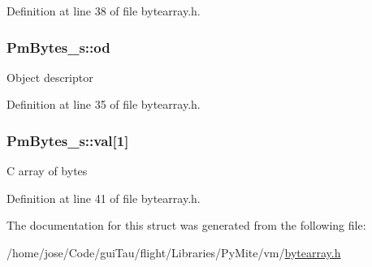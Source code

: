 Definition at line 38 of file bytearray.\-h.

\hypertarget{struct_pm_bytes__s_af46dba8cd181c493c83f48d7744f29d1}{
\subsubsection[{od}]{ Pm\-Bytes\-\_\-s\-::od}}\label{struct_pm_bytes__s_af46dba8cd181c493c83f48d7744f29d1}
Object descriptor 

Definition at line 35 of file bytearray.\-h.

\hypertarget{struct_pm_bytes__s_a48c85dd0c8010f5e5ee924dbc893031e}{
\subsubsection[{val}]{ Pm\-Bytes\-\_\-s\-::val\mbox{[}1\mbox{]}}}\label{struct_pm_bytes__s_a48c85dd0c8010f5e5ee924dbc893031e}
C array of bytes 

Definition at line 41 of file bytearray.\-h.



The documentation for this struct was generated from the following file\-:\begin{DoxyCompactItemize}
\item 
/home/jose/\-Code/gui\-Tau/flight/\-Libraries/\-Py\-Mite/vm/\hyperlink{bytearray_8h}{bytearray.\-h}\end{DoxyCompactItemize}
